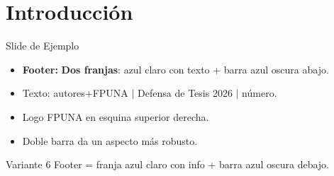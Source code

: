 \documentclass[12pt, aspectratio=169]{beamer}
\begin{document}
\section{Introducci\'on}
\begin{frame}{Slide de Ejemplo}
\begin{itemize}
  \item \textbf{Footer:} \textbf{Dos franjas}: azul claro con texto + barra azul oscura abajo.
  \item Texto: autores+FPUNA $|$ Defensa de Tesis 2026 $|$ n\'umero.
  \item Logo FPUNA en esquina superior derecha.
  \item Doble barra da un aspecto m\'as robusto.
\end{itemize}
\begin{block}{Variante 6}
  Footer = franja azul claro con info + barra azul oscura debajo.
\end{block}
\end{frame}
\end{document}
